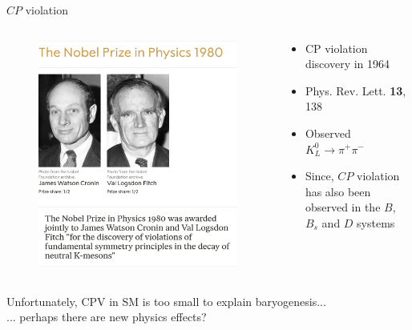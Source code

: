 \documentclass[dvipsnames]{beamer}
\begin{document}
\begin{frame}{$C\!P$ violation}
  \begin{columns}
    \begin{column}{0.4\textwidth}
      \begin{figure}
        \includegraphics[width=1.0\textwidth]{Plots/NobelPrizePhysics1980.png}
      \end{figure}
    \end{column}
    \begin{column}{0.6\textwidth}
      \begin{itemize}
        \setlength\itemsep{1.0em}
        \item{CP violation discovery in 1964}
        \item{Phys. Rev. Lett. \textbf{13}, 138}
        \item{Observed $K_L^0\to\pi^+\pi^-$}
        \item{Since, $C\!P$ violation has also been observed in the $B$, $B_s$ and $D$ systems}
      \end{itemize}
    \end{column}
  \end{columns}
  \vspace{0.5cm}
  \begin{center}
    \large Unfortunately, CPV in SM is too small to explain baryogenesis...\\... perhaps there are new physics effects?
  \end{center}
\end{frame}
\end{document}
